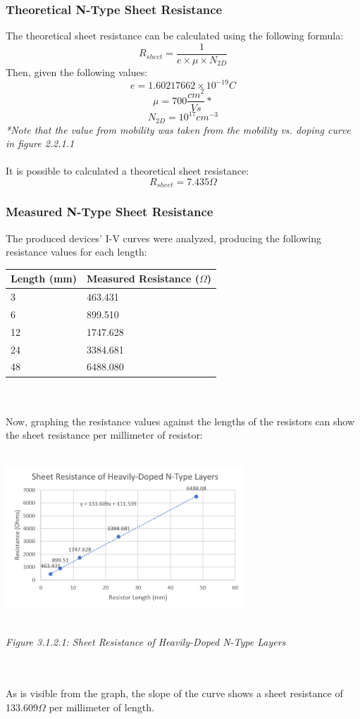 \documentclass[12pt]{article}
\begin{document}
\subsubsection{Theoretical N-Type Sheet Resistance}
The theoretical sheet resistance can be calculated using the following formula:
\[ R_{sheet} = \frac{1}{e \times \mu \times N_{2D}} \]
Then, given the following values:
\[e = 1.60217662 \times 10^{-19} C\]
\[\mu = 700\frac{cm^2}{Vs}* \]
\[N_{2D} = 10^{17} cm^{-3} \]
\emph{*Note that the value from mobility was taken from the mobility vs. doping curve in figure 2.2.1.1}
\\
\\It is possible to calculated a theoretical sheet resistance:
\[R_{sheet} = 7.435\Omega \]

\subsubsection{Measured N-Type Sheet Resistance}
The produced devices' I-V curves were analyzed, producing the following resistance values for each length:
\begin{center}
\begin{tabular}{|l|l|}
\hline
Length (mm) & Measured Resistance ($\Omega$) \\ \hline
3           & 463.431                        \\ \hline
6           & 899.510                        \\ \hline
12          & 1747.628                       \\ \hline
24          & 3384.681                       \\ \hline
48          & 6488.080                       \\ \hline
\end{tabular}
\end{center}
\\
\\Now, graphing the resistance values against the lengths of the resistors can show the sheet resistance per millimeter of resistor:
\\
\\\centerline{\includegraphics[width=9cm] {N Resistance.PNG}}
\begin{center}
\\\emph{Figure 3.1.2.1: Sheet Resistance of Heavily-Doped N-Type Layers}
\end{center}
\\
\\As is visible from the graph, the slope of the curve shows a sheet resistance of 133.609$\Omega$ per millimeter of length. 
\end{document}
